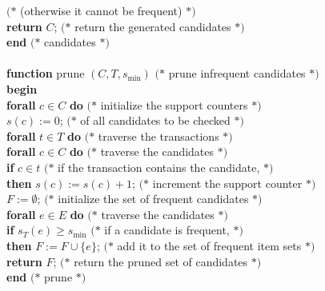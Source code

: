 \documentclass{article}
\begin{document}
\begin{tabbing}
   \>\>\>\>   $(*$ (otherwise it cannot be frequent) $*)$ \\
\> {\bf return} $C$;
   \>\>\>\>   $(*$ return the generated candidates $*)$ \\
{\bf end} $(*$ candidates $*)$ \\
\\
{\bf function} prune $(C, T, s_{\min})$
   \>\>\>\>\> $(*$ prune infrequent candidates $*)$ \\
{\bf begin} \\
\> {\bf forall} $c \in C$ {\bf do}
   \>\>\>\>   $(*$ initialize the support counters $*)$ \\
\> \> $s(c) := 0$;
   \>\>\>     $(*$ of all candidates to be checked $*)$ \\
\> {\bf forall} $t \in T$ {\bf do}
   \>\>\>\>   $(*$ traverse the transactions $*)$ \\
\> \> {\bf forall} $c \in C$ {\bf do}
   \>\>\>     $(*$ traverse the candidates $*)$ \\
\> \> \> {\bf if} $c \in t$
   \>\>       $(*$ if the transaction contains the candidate, $*)$ \\
\> \> \> {\bf then} $s(c) := s(c) +1$;
   \>\>       $(*$ increment the support counter $*)$ \\
\> $F := \emptyset$;
   \>\>\>\> $(*$ initialize the set of frequent candidates $*)$ \\[.7ex]
\> {\bf forall} $e \in E$ {\bf do}
   \>\>\>\> $(*$ traverse the candidates $*)$ \\[.7ex]
\> \> {\bf if} $s_T(e) \ge s_{\min}$
   \>\>\>   $(*$ if a candidate is frequent, $*)$ \\[.7ex]
\> \> {\bf then} $F := F \cup \{e\}$;
   \>\>\>   $(*$ add it to the set of frequent item sets $*)$ \\[.7ex]
\> {\bf return} $F$;
   \>\>\>\> $(*$ return the pruned set of candidates $*)$ \\[.7ex]
{\bf end} $(*$ prune $*)$
\end{tabbing}
\end{document}
